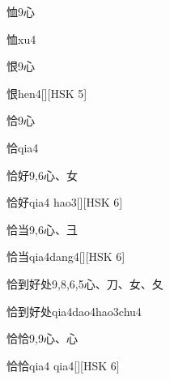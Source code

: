 \begin{Entry}{恤}{9}{⼼}
  \begin{Phonetics}{恤}{xu4}
  \end{Phonetics}
\end{Entry}

\begin{Entry}{恨}{9}{⼼}
  \begin{Phonetics}{恨}{hen4}[][HSK 5]
  \end{Phonetics}
\end{Entry}

\begin{Entry}{恰}{9}{⼼}
  \begin{Phonetics}{恰}{qia4}
  \end{Phonetics}
\end{Entry}

\begin{Entry}{恰好}{9,6}{⼼、⼥}
  \begin{Phonetics}{恰好}{qia4 hao3}[][HSK 6]
  \end{Phonetics}
\end{Entry}

\begin{Entry}{恰当}{9,6}{⼼、⼹}
  \begin{Phonetics}{恰当}{qia4dang4}[][HSK 6]
  \end{Phonetics}
\end{Entry}

\begin{Entry}{恰到好处}{9,8,6,5}{⼼、⼑、⼥、⼡}
  \begin{Phonetics}{恰到好处}{qia4dao4hao3chu4}
  \end{Phonetics}
\end{Entry}

\begin{Entry}{恰恰}{9,9}{⼼、⼼}
  \begin{Phonetics}{恰恰}{qia4 qia4}[][HSK 6]
  \end{Phonetics}
\end{Entry}

